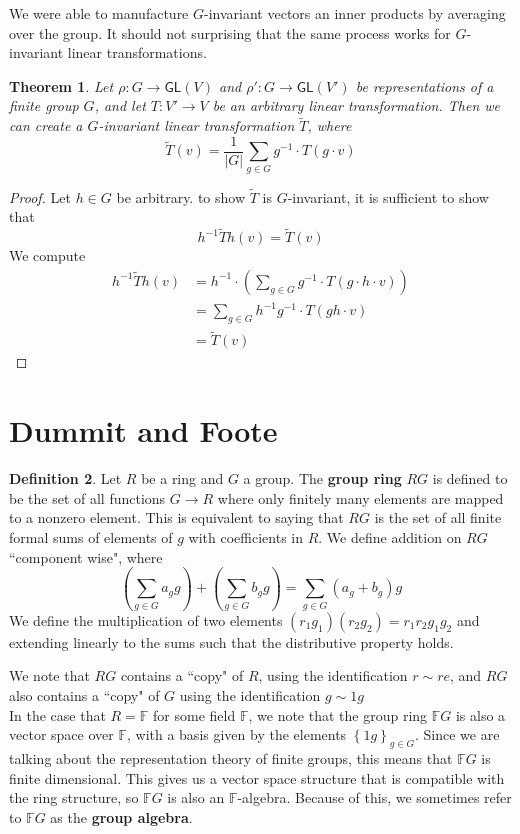 \documentclass[psamsfonts]{amsart}
\newtheorem{thm}{Theorem}[section]
\theoremstyle{definition}
\newtheorem{defn}[thm]{Definition}
\theoremstyle{remark}
\newcommand{\F}{\mathbb{F}}
\newcommand{\GL}{\mathsf{GL}}
\newcommand{\inv}{^{-1}}
\newcommand{\set}[1]{\left\lbrace#1 \right\rbrace}
\newcommand{\abs}[1]{\left\lvert#1\right\rvert}
\begin{document}
We were able to manufacture $G$-invariant vectors an inner products by averaging over the group. It should not surprising that the same process works for $G$-invariant linear transformations.
\begin{thm}
Let $\rho: G \to \GL(V)$ and $\rho': G \to \GL(V')$ be representations of a finite group $G$, and let $T: V' \to V$ be an arbitrary linear transformation. Then we can create a $G$-invariant linear transformation $\tilde{T}$, where
$$\tilde{T}(v) = \frac{1}{\abs{G}}\sum_{g \in G} g\inv \cdot T(g \cdot v) $$
\end{thm}

\begin{proof}
Let $h \in G$ be arbitrary. to show $\tilde{T}$ is $G$-invariant, it is sufficient to show that 
$$h\inv \tilde{T} h(v) = \tilde{T}(v) $$
We compute
\begin{align*}
h\inv\tilde{T}h(v) &= h\inv \cdot \left( \sum_{g \in G} g\inv \cdot T(g \cdot h \cdot v) \right) \\
&= \sum_{g \in G} h\inv g\inv \cdot T(gh \cdot v)\\
&= \tilde{T}(v)
\end{align*}
\end{proof}

\section{Dummit and Foote}

\begin{defn}
Let $R$ be a ring and $G$ a group. The \textbf{group ring} $RG$ is defined to be the set of all functions $G \to R$ where only finitely many elements are mapped to a nonzero element. This is equivalent to saying that $RG$ is the set of all finite formal sums of elements of $g$ with coefficients in $R$. We define addition on $RG$ ``component wise", where
$$\left( \sum_{g \in G} a_g g \right) +  \left( \sum_{g \in G}b_g g \right) = \sum_{g \in G} (a_g + b_g) g $$
We define the multiplication of two elements $(r_1g_1)(r_2g_2) = r_1r_2g_1g_2$ and extending linearly to the sums such that the distributive property holds.
\end{defn}

We note that $RG$ contains a ``copy" of $R$, using the identification $r \sim r e$, and $RG$ also contains a ``copy" of $G$ using the identification $g \sim 1g$\\

In the case that $R = \F$ for some field $\F$, we note that the group ring $\F G$ is also a vector space over $\F$, with a basis given by the elements $\set{1g}_{g \in G}$. Since we are talking about the representation theory of finite groups, this means that $\F G$ is finite dimensional. This gives us a vector space structure that is compatible with the ring structure, so $\F G$ is also an $\F$-algebra. Because of this, we sometimes refer to $\F G$ as the \textbf{group algebra}.
\end{document}
